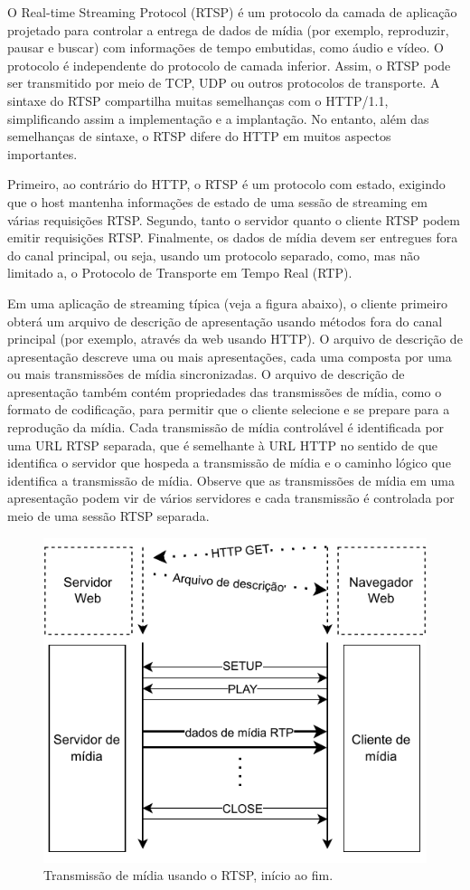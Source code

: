 \documentclass[12pt, %
openright, 
oneside, %
a4paper,    %
brazil]{facom-ufu-abntex2}
\begin{document}
O Real-time Streaming Protocol (RTSP) é um protocolo da camada de aplicação
projetado para controlar a entrega de dados de mídia (por exemplo, reproduzir,
pausar e buscar) com informações de tempo embutidas, como áudio e vídeo. O
protocolo é independente do protocolo de camada inferior. Assim, o RTSP pode
ser transmitido por meio de TCP, UDP ou outros protocolos de transporte. A
sintaxe do RTSP compartilha muitas semelhanças com o HTTP/1.1, simplificando
assim a implementação e a implantação. No entanto, além das semelhanças de
sintaxe, o RTSP difere do HTTP em muitos aspectos importantes.

Primeiro, ao contrário do HTTP, o RTSP é um protocolo com estado, exigindo que
o host mantenha informações de estado de uma sessão de streaming em várias
requisições RTSP. Segundo, tanto o servidor quanto o cliente RTSP podem emitir
requisições RTSP. Finalmente, os dados de mídia devem ser entregues fora do
canal principal, ou seja, usando um protocolo separado, como, mas não limitado
a, o Protocolo de Transporte em Tempo Real (RTP).

Em uma aplicação de streaming típica (veja a figura abaixo), o cliente primeiro
obterá um arquivo de descrição de apresentação usando métodos fora do canal
principal (por exemplo, através da web usando HTTP). O arquivo de descrição de
apresentação descreve uma ou mais apresentações, cada uma composta por uma ou
mais transmissões de mídia sincronizadas. O arquivo de descrição de
apresentação também contém propriedades das transmissões de mídia, como o
formato de codificação, para permitir que o cliente selecione e se prepare para
a reprodução da mídia. Cada transmissão de mídia controlável é identificada por
uma URL RTSP separada, que é semelhante à URL HTTP no sentido de que identifica
o servidor que hospeda a transmissão de mídia e o caminho lógico que identifica
a transmissão de mídia. Observe que as transmissões de mídia em uma
apresentação podem vir de vários servidores e cada transmissão é controlada por
meio de uma sessão RTSP separada. \cite{rfc2326}

\begin{figure}[!ht]
	\centering
	\includegraphics[width=0.8\linewidth]{rtsp.pdf}
	\caption[Diagrama RTSP]{Transmissão de mídia usando o RTSP, início ao fim. }

	\label{fig:rtspDiagram}
\end{figure}
\end{document}

